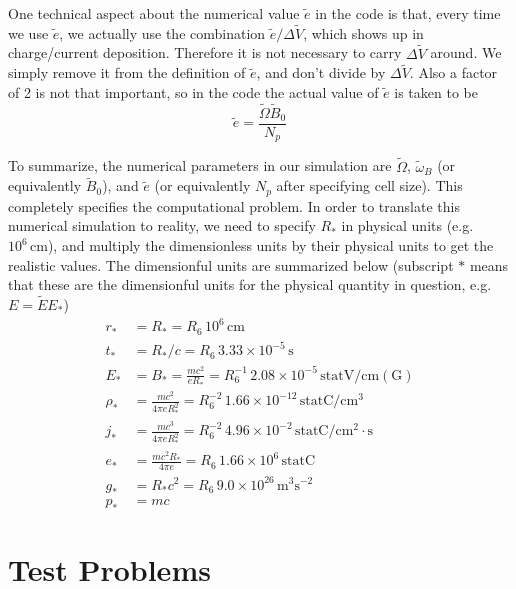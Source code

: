 One technical aspect about the numerical value $\tilde{e}$ in the code is that,
every time we use $\tilde{e}$, we actually use the combination $\tilde{e}/\Delta
\tilde{V}$, which shows up in charge/current deposition. Therefore it is not
necessary to carry $\Delta \tilde{V}$ around. We simply remove it from the
definition of $\tilde{e}$, and don't divide by $\Delta \tilde{V}$. Also a factor
of 2 is not that important, so in the code the actual value of $\tilde{e}$ is
taken to be
\begin{equation}
    \tilde{e} = \frac{\tilde{\Omega} \tilde{B}_0}{N_{p}}
\end{equation}

To summarize, the numerical parameters in our simulation are $\tilde{\Omega}$,
$\tilde{\omega}_B$ (or equivalently $\tilde{B}_{0}$), and $\tilde{e}$ (or
equivalently $N_p$ after specifying cell size). This completely specifies the
computational problem. In order to translate this numerical simulation to
reality, we need to specify $R_{*}$ in physical units (e.g.\ $10^6\,
\mathrm{cm}$), and multiply the dimensionless units by their physical units to
get the realistic values. The dimensionful units are summarized below (subscript
$*$ means that these are the dimensionful units for the physical quantity in
question, e.g.\ $E = \tilde{E} E_*$)
\begin{align}
  r_{*} &= R_{*} = R_6\, 10^6\, \mathrm{cm} \\
  t_{*} &= R_{*} / c = R_6\,3.33\times 10^{-5}\, \mathrm{s} \\
  E_{*} &= B_{*} = \frac{mc^2}{eR_{*}} = R_6^{-1}\, 2.08\times 10^{-5}\, \mathrm{statV/cm(G)} \\
  \rho_{*} &= \frac{mc^2}{4\pi eR_{*}^2} = R_{6}^{-2}\, 1.66\times 10^{-12}\, \mathrm{statC/cm^3} \\
  j_{*} &= \frac{mc^3}{4\pi eR_{*}^2} = R_{6}^{-2}\, 4.96\times 10^{-2}\, \mathrm{statC/cm^2\cdot s}  \\
  e_{*} &= \frac{mc^2R_{*}}{4\pi e} = R_6\, 1.66\times 10^6\, \mathrm{statC} \\
  g_{*} &= R_{*}c^2 = R_6\, 9.0\times 10^{26}\, \mathrm{m^3s^{-2}} \\
  p_{*} &= mc
\end{align}

\section{Test Problems}
\label{sec:test-problems}

